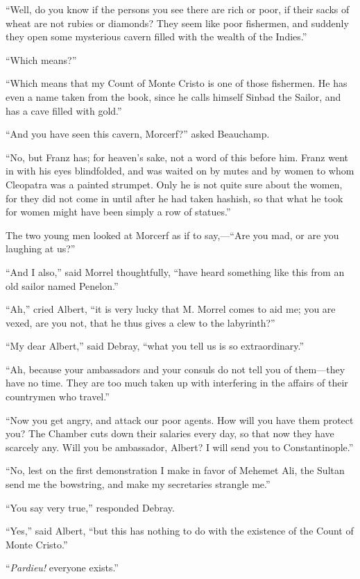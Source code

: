 “Well, do you know if the persons you see there are rich or poor, if
their sacks of wheat are not rubies or diamonds? They seem like poor
fishermen, and suddenly they open some mysterious cavern filled with
the wealth of the Indies.”

“Which means?”

“Which means that my Count of Monte Cristo is one of those fishermen.
He has even a name taken from the book, since he calls himself Sinbad
the Sailor, and has a cave filled with gold.”

“And you have seen this cavern, Morcerf?” asked Beauchamp.

“No, but Franz has; for heaven’s sake, not a word of this before him.
Franz went in with his eyes blindfolded, and was waited on by mutes and
by women to whom Cleopatra was a painted strumpet. Only he is not quite
sure about the women, for they did not come in until after he had taken
hashish, so that what he took for women might have been simply a row of
statues.”

The two young men looked at Morcerf as if to say,—“Are you mad, or are
you laughing at us?”

“And I also,” said Morrel thoughtfully, “have heard something like this
from an old sailor named Penelon.”

“Ah,” cried Albert, “it is very lucky that M. Morrel comes to aid me;
you are vexed, are you not, that he thus gives a clew to the
labyrinth?”

“My dear Albert,” said Debray, “what you tell us is so extraordinary.”

“Ah, because your ambassadors and your consuls do not tell you of
them—they have no time. They are too much taken up with interfering in
the affairs of their countrymen who travel.”

“Now you get angry, and attack our poor agents. How will you have them
protect you? The Chamber cuts down their salaries every day, so that
now they have scarcely any. Will you be ambassador, Albert? I will send
you to Constantinople.”

“No, lest on the first demonstration I make in favor of Mehemet Ali,
the Sultan send me the bowstring, and make my secretaries strangle me.”

“You say very true,” responded Debray.

“Yes,” said Albert, “but this has nothing to do with the existence of
the Count of Monte Cristo.”

“\textit{Pardieu!} everyone exists.”


